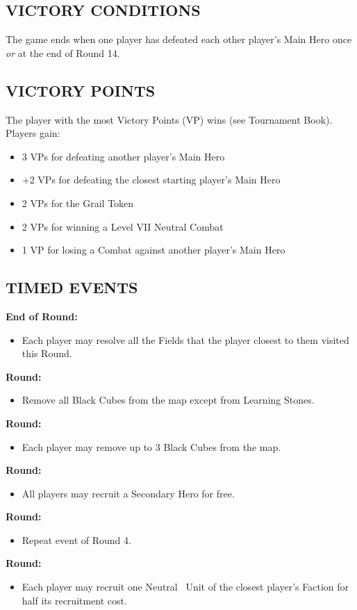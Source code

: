 \begin{multicols*}{2}
\subsection*{\MakeUppercase{Victory Conditions}}
The game ends when one player has defeated each other player's Main Hero once \textit{or} at the end of Round 14.

\subsection*{\MakeUppercase{Victory Points}}
The player with the most Victory Points (VP) wins (see Tournament Book). Players gain:

\begin{itemize}
  \item 3 VPs for defeating another player's Main Hero
  \item +2 VPs for defeating the closest starting player's Main Hero
  \item 2 VPs for the Grail Token
  \item 2 VPs for winning a Level VII Neutral Combat
  \item 1 VP for losing a Combat against another player's Main Hero
\end{itemize}

\subsection*{\MakeUppercase{Timed Events}}

\textbf{End of  Round:}
\begin{itemize}
  \item Each player may resolve all the Fields that the player closest to them visited this Round.
\end{itemize}
\textbf{ Round:}
\begin{itemize}
  \item Remove all Black Cubes from the map except from Learning Stones.
\end{itemize}
\textbf{ Round:}
\begin{itemize}
  \item Each player may remove up to 3 Black Cubes from the map.
\end{itemize}
\textbf{ Round:}
\begin{itemize}
  \item All players may recruit a Secondary Hero for free.
\end{itemize}
\textbf{ Round:}
\begin{itemize}
  \item Repeat event of Round 4.
\end{itemize}
\textbf{ Round:}
\begin{itemize}
  \item Each player may recruit one Neutral \silver\ Unit of the closest player's Faction for half its recruitment cost.
\end{itemize}


\end{multicols*}
